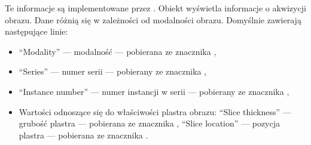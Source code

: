 Te informacje są implementowane przez .
Obiekt wyświetla informacje o akwizycji obrazu.
Dane różnią się w zależności od modalności obrazu.
Domyślnie zawierają następujące linie:
\begin{itemize}
    \item \enquote{Modality} --- modalność --- pobierana ze znacznika ,
    \item \enquote{Series} --- numer serii --- pobierany ze znacznika ,
    \item \enquote{Instance number} --- numer instancji w serii --- pobierany ze znacznika ,
    \item Wartości odnoszące się do właściwości plastra obrazu:
          \enquote{Slice thickness} --- grubość plastra --- pobierana ze znacznika ,
          \enquote{Slice location} --- pozycja plastra --- pobierana ze znacznika .
\end{itemize}

